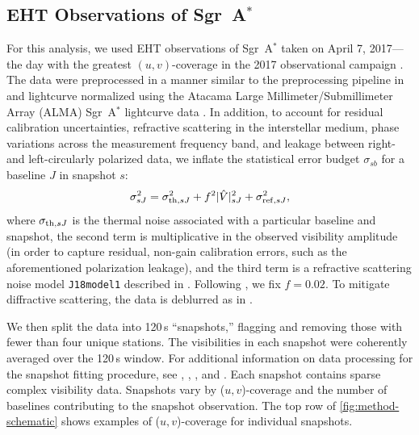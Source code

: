 \documentclass[linenumbers, twocolumn, tighten]{aastex701}
\def\sgra{Sgr~A$^*$\xspace}
\begin{document}



\subsection{EHT Observations of \sgra} \label{subsec:obs-SgrA}

For this analysis, we used EHT observations of \sgra taken on April 7, 2017---the day with the greatest $(u,v)$-coverage in the 2017 observational campaign . The data were preprocessed in a manner similar to the preprocessing pipeline in  and lightcurve normalized using the Atacama Large Millimeter/Submillimeter
Array (ALMA) \sgra lightcurve data . In addition, to account for residual calibration uncertainties, refractive scattering in the interstellar medium, phase variations across the measurement frequency band, and leakage between right- and left-circularly polarized data, we inflate the statistical error budget $\sigma_{sb}$ for a baseline $J$ in snapshot $s$:
\begin{equation}
    \sigma^2_{sJ} = \sigma_{{\rm th},sJ}^2 + f^2|\hat{V}|^2_{sJ} + \sigma^2_{{\rm ref},sJ},
\end{equation}
where $\sigma_{{\rm th},sJ}$ is the thermal noise associated with a particular baseline and snapshot, the second term is multiplicative in the observed visibility amplitude (in order to capture residual, non-gain calibration errors, such as the aforementioned polarization leakage), and the third term is a refractive scattering noise model \texttt{J18model1} described in . Following , we fix $f = 0.02$. To mitigate diffractive scattering, the data is deblurred as in \citealt{2018ApJ...865..104J}.

We then split the data into 120\,s ``snapshots,'' flagging and removing those with fewer than four unique stations.
The visibilities in each snapshot were coherently averaged over the 120\,s window. For additional information on data processing for the snapshot fitting procedure, see , , , and . Each snapshot contains sparse complex visibility data. Snapshots vary by ($u,v$)-coverage and the number of baselines contributing to the snapshot observation. The top row of \autoref{fig:method-schematic} shows examples of ($u,v$)-coverage for individual snapshots.
\end{document}
